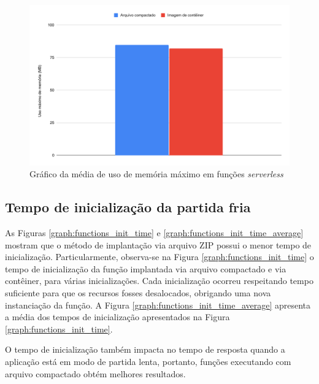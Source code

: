 \documentclass[conference]{IEEEtran}
\begin{document}
\begin{figure}[H]
    \centering 
    \includegraphics [width=\linewidth]{images/max-memory-use-average-PT.pdf}
    \par
    \caption{Gráfico da média de uso de memória máximo em funções \textit{serverless}}
    \label{graph:functions_max_memory_used_average}
\end{figure}

\subsection{Tempo de inicialização da partida fria} 
\label{subsec:cold_start_time}

As Figuras \ref{graph:functions_init_time} e \ref{graph:functions_init_time_average} mostram que o método de implantação via arquivo ZIP possui o menor tempo de inicialização. Particularmente, observa-se na Figura \ref{graph:functions_init_time} o tempo de inicialização da função implantada via arquivo compactado e via contêiner, para várias inicializações. Cada inicialização ocorreu respeitando tempo suficiente para que os recursos fosses desalocados, obrigando uma nova instanciação da função. A Figura \ref{graph:functions_init_time_average} apresenta a média dos tempos de inicialização apresentados na Figura \ref{graph:functions_init_time}.

O tempo de inicialização também impacta no tempo de resposta quando a aplicação está em modo de partida lenta, portanto, funções executando com arquivo compactado obtém melhores resultados.
\end{document}
